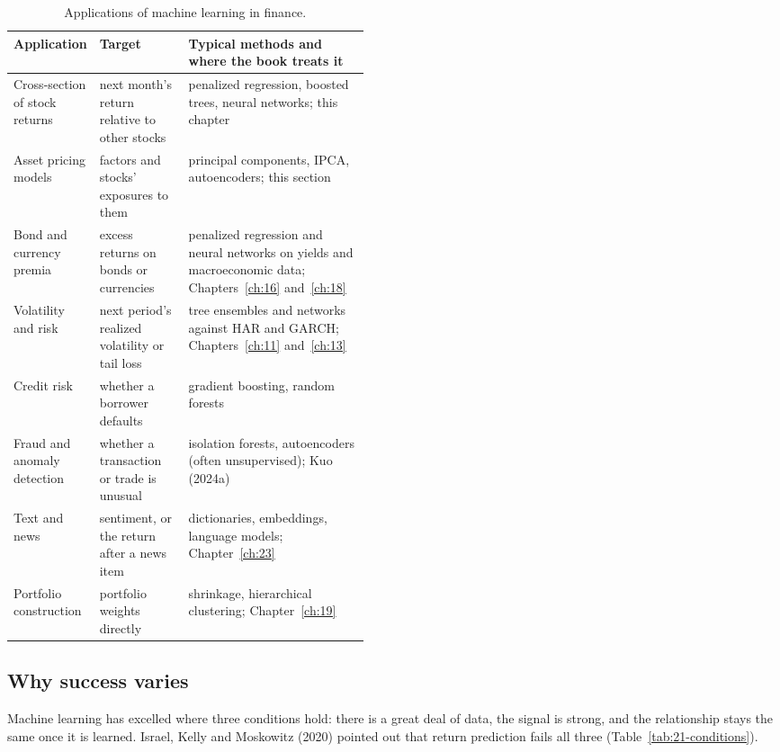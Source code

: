 \begin{table}[htbp]
\centering
\small
\caption{Applications of machine learning in finance.}
\label{tab:21-applications}
\begin{tabularx}{0.95\linewidth}{@{}>{\raggedright\arraybackslash}p{0.21\linewidth}>{\raggedright\arraybackslash}p{0.25\linewidth}>{\raggedright\arraybackslash}X@{}}
\toprule
Application & Target & Typical methods and where the book treats it \\
\midrule
Cross-section of stock returns & next month's return relative to other stocks & penalized regression, boosted trees, neural networks; this chapter \\
Asset pricing models & factors and stocks' exposures to them & principal components, IPCA, autoencoders; this section \\
Bond and currency premia & excess returns on bonds or currencies & penalized regression and neural networks on yields and macroeconomic data; Chapters~\ref{ch:16} and~\ref{ch:18} \\
Volatility and risk & next period's realized volatility or tail loss & tree ensembles and networks against HAR and GARCH; Chapters~\ref{ch:11} and~\ref{ch:13} \\
Credit risk & whether a borrower defaults & gradient boosting, random forests \\
Fraud and anomaly detection & whether a transaction or trade is unusual & isolation forests, autoencoders (often unsupervised); Kuo (2024a) \\
Text and news & sentiment, or the return after a news item & dictionaries, embeddings, language models; Chapter~\ref{ch:23} \\
Portfolio construction & portfolio weights directly & shrinkage, hierarchical clustering; Chapter~\ref{ch:19} \\
\bottomrule
\end{tabularx}
\end{table}

\subsection{Why success varies}

Machine learning has excelled where three conditions hold: there is a great deal of data, the signal is strong, and the relationship stays the same once it is learned. Israel, Kelly and Moskowitz (2020) pointed out that return prediction fails all three (Table~\ref{tab:21-conditions}).

